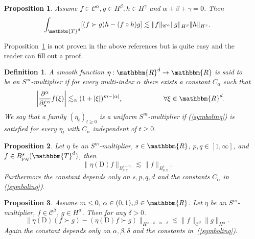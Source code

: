 \documentclass[11pt]{article}
\newcommand{\mathD}{\mathrm{D}}
\newtheorem{definition}{Definition}
\newtheorem{proposition}{Proposition}
{\theorembodyfont{\rmfamily}\newtheorem{remark}{Remark}}
\newcommand{\VV}{\mathscr{C}}
\begin{document}
\begin{proposition}
  \label{adjointparaproduct}Assume $f \in \VV^{\alpha}, g \in H^{\beta}, h \in
  H^{\gamma}$ and $\alpha + \beta + \gamma = 0$. Then
  \[ \int_{\mathbbm{T}^d} [(f \succ g) h - (f \circ h) g] \lesssim \| f
     \|_{\VV^{\alpha}} \| g \|_{H^{\beta}} \| h \|_{H^{\gamma}} . \]
\end{proposition}

\begin{remark}
  Proposition~\ref{adjointparaproduct} is not proven in the above references
  but is quite easy and the reader can fill out a proof.
\end{remark}

\begin{definition}
  A smooth function $\eta : \mathbbm{R}^d \rightarrow \mathbbm{R}$ is said to
  be an $S^m$-multiplier if for every multi-index $\alpha$ there exists a
  constant $C_{\alpha}$ such that
  \begin{equation}
    \quad \left| \frac{\partial^{\alpha}}{\partial \xi^{\alpha}} f (\xi)
    \right| \lesssim_{\alpha} (1 + | \xi |)^{m - | \alpha |}, \qquad \qquad
    \qquad \forall \xi \in \mathbbm{R}^d . \label{symbolinq}
  \end{equation}
  We say that a family $(\eta_t)_{t \geqslant 0}$ is a uniform
  $S^m$-multiplier if (\ref{symbolinq}) is satisfied for every $\eta_t$ with
  $C_{\alpha}$ independent of $t \geqslant 0$. 
\end{definition}

\begin{proposition}
  \label{multiplierestimate}Let $\eta$ be an $S^m$-multiplier, $s \in
  \mathbbm{R}$, $p, q \in [1, \infty]$, and $f \in B_{p, q}^s
  (\mathbbm{T}^d)$, then
  \[ \| \eta (\mathD) f \|_{B_{p, q}^{s - m}} \lesssim \| f \|_{B_{p, q}^s} .
  \]
  Furthermore the constant depends only on $s, p, q, d$ and the constants
  $C_{\alpha}$ in (\ref{symbolinq}).
\end{proposition}

\begin{proposition}
  \label{paraproductleibniz}Assume $m \leqslant 0$, $\alpha \in (0, 1), \beta
  \in \mathbbm{R}$. Let $\eta$ be an $S^m$-multiplier, $f \in \VV^{\beta}$, $g
  \in H^{\alpha}$. Then for any $\delta > 0$.
  \[ \| \eta (\mathD) (f \succ g) - (\eta (\mathD) f \succ g) \|_{H^{\alpha +
     \beta - m - \delta}} \lesssim \| f \|_{\VV^{\beta}} \| g \|_{H^{\alpha}}
     . \]
  Again the constant depends only on $\alpha, \beta, \delta$ and the constants
  in~(\ref{symbolinq}).
\end{proposition}
\end{document}

